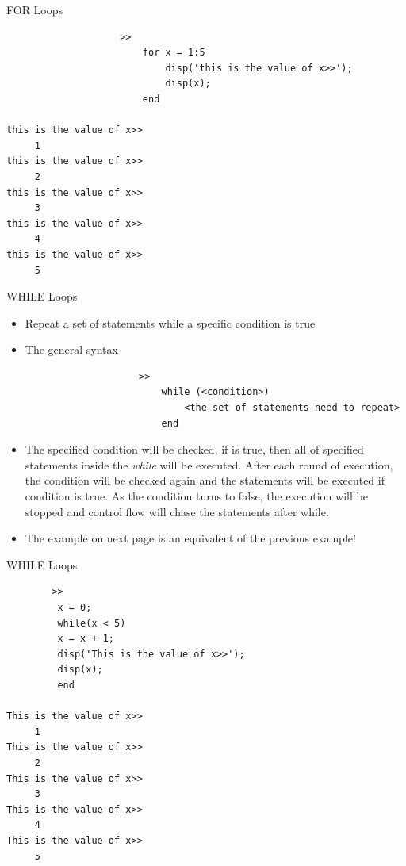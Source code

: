 \documentclass{beamer}
\begin{document}
\begin{frame}[fragile]{FOR Loops}
	\begin{block}{}
				\java
				\begin{lstlisting}
					>> 
						for x = 1:5
							disp('this is the value of x>>');
							disp(x);
						end

this is the value of x>>
     1
this is the value of x>>
     2
this is the value of x>>
     3
this is the value of x>>
     4
this is the value of x>>
     5

				\end{lstlisting}

	\end{block}
\end{frame}
	
	
\begin{frame}[fragile]{WHILE Loops}
	\begin{block}{}
		\begin{itemize}
			\item Repeat a set of statements while a specific condition is true
			\item The general syntax
			\java
				\begin{lstlisting}
					>> 
						while (<condition>)
							<the set of statements need to repeat>
						end
				\end{lstlisting}
			\item The specified condition will be checked, if is true, then all of specified statements inside the \textit{while} will be executed. After each round of execution, the condition will be checked again and the statements will be executed if condition is true. As the condition turns to false, the execution will be stopped and control flow will chase the statements after while.
			\item The example on next page is an equivalent of the previous example!
		\end{itemize}	
	
	\end{block}
\end{frame}
	

\begin{frame}[fragile]{WHILE Loops}
	\begin{block}{}
		\java
		\begin{lstlisting}
		>>
		 x = 0;
		 while(x < 5)
		 x = x + 1;
		 disp('This is the value of x>>');
		 disp(x);
		 end
		 
This is the value of x>>
     1
This is the value of x>>
     2
This is the value of x>>
     3
This is the value of x>>
     4
This is the value of x>>
     5

		\end{lstlisting}
	\end{block}

\end{frame}	
	
\end{document}
